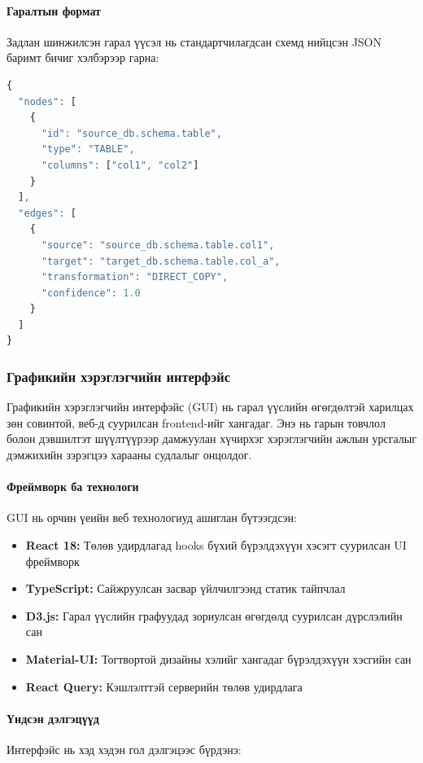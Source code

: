 \paragraph{Гаралтын формат}
Задлан шинжилсэн гарал үүсэл нь стандартчилагдсан схемд нийцсэн JSON баримт бичиг хэлбэрээр гарна:

\begin{lstlisting}[language=JavaScript, caption=Гарал үүслийн гаралтын схем]
{
  "nodes": [
    {
      "id": "source_db.schema.table",
      "type": "TABLE",
      "columns": ["col1", "col2"]
    }
  ],
  "edges": [
    {
      "source": "source_db.schema.table.col1",
      "target": "target_db.schema.table.col_a",
      "transformation": "DIRECT_COPY",
      "confidence": 1.0
    }
  ]
}
\end{lstlisting}

\subsubsection{Графикийн хэрэглэгчийн интерфэйс}

Графикийн хэрэглэгчийн интерфэйс (GUI) нь гарал үүслийн өгөгдөлтэй харилцах зөн совинтой, веб-д суурилсан frontend-ийг хангадаг. Энэ нь гарын товчлол болон дэвшилтэт шүүлтүүрээр дамжуулан хүчирхэг хэрэглэгчийн ажлын урсгалыг дэмжихийн зэрэгцээ харааны судлалыг онцолдог.

\paragraph{Фреймворк ба технологи}
GUI нь орчин үеийн веб технологиуд ашиглан бүтээгдсэн:

\begin{itemize}
    \item \textbf{React 18:} Төлөв удирдлагад hooks бүхий бүрэлдэхүүн хэсэгт суурилсан UI фреймворк
    \item \textbf{TypeScript:} Сайжруулсан засвар үйлчилгээнд статик тайпчлал
    \item \textbf{D3.js:} Гарал үүслийн графуудад зориулсан өгөгдөлд суурилсан дүрслэлийн сан
    \item \textbf{Material-UI:} Тогтвортой дизайны хэлийг хангадаг бүрэлдэхүүн хэсгийн сан
    \item \textbf{React Query:} Кэшлэлттэй серверийн төлөв удирдлага
\end{itemize}

\paragraph{Үндсэн дэлгэцүүд}
Интерфэйс нь хэд хэдэн гол дэлгэцээс бүрдэнэ:

